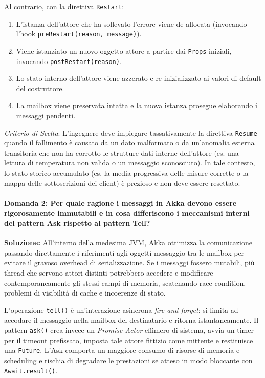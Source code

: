 Al contrario, con la direttiva \texttt{Restart}:
\begin{enumerate}
    \item L'istanza dell'attore che ha sollevato l'errore viene de-allocata (invocando l'hook \texttt{preRestart(reason, message)}).
    \item Viene istanziato un nuovo oggetto attore a partire dai \texttt{Props} iniziali, invocando \texttt{postRestart(reason)}.
    \item Lo stato interno dell'attore viene azzerato e re-inizializzato ai valori di default del costruttore.
    \item La mailbox viene preservata intatta e la nuova istanza prosegue elaborando i messaggi pendenti.
\end{enumerate}
\textit{Criterio di Scelta}: L'ingegnere deve impiegare tassativamente la direttiva \texttt{Resume} quando il fallimento è causato da un dato malformato o da un'anomalia esterna transitoria che non ha corrotto le strutture dati interne dell'attore (es. una lettura di temperatura non valida o un messaggio sconosciuto). In tale contesto, lo stato storico accumulato (es. la media progressiva delle misure corrette o la mappa delle sottoscrizioni dei client) è prezioso e non deve essere resettato.

\paragraph{Domanda 2: Per quale ragione i messaggi in Akka devono essere rigorosamente immutabili e in cosa differiscono i meccanismi interni del pattern Ask rispetto al pattern Tell?}
\textbf{Soluzione:}
All'interno della medesima JVM, Akka ottimizza la comunicazione passando direttamente i riferimenti agli oggetti messaggio tra le mailbox per evitare il gravoso overhead di serializzazione. Se i messaggi fossero mutabili, più thread che servono attori distinti potrebbero accedere e modificare contemporaneamente gli stessi campi di memoria, scatenando race condition, problemi di visibilità di cache e incoerenze di stato.

L'operazione \texttt{tell()} è un'interazione asincrona \textit{fire-and-forget}: si limita ad accodare il messaggio nella mailbox del destinatario e ritorna istantaneamente. Il pattern \texttt{ask()} crea invece un \textit{Promise Actor} effimero di sistema, avvia un timer per il timeout prefissato, imposta tale attore fittizio come mittente e restituisce una \texttt{Future}. L'Ask comporta un maggiore consumo di risorse di memoria e scheduling e rischia di degradare le prestazioni se atteso in modo bloccante con \texttt{Await.result()}.

